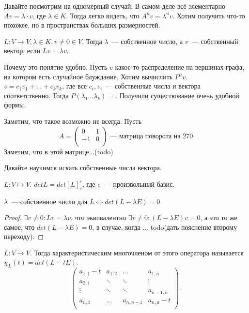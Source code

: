 \begin{motivation}
    Давайте посмотрим на одномерный случай. В самом деле всё элементарно $Av = \lambda\cdot v$, где $\lambda\in K$.
    Тогда легко видеть, что $A^nv = \lambda^n v$. Хотим получить что-то похожее, но в пространствах больших размерностей.
\end{motivation}
\begin{definition}
    $L\colon V\rightarrow V, \lambda\in K, v\not= 0\in V$. Тогда $\lambda$~--- собственное число, а $v$~--- собственный вектор,
    если $Lv = \lambda v$.
\end{definition}
\begin{motivation}
    Почему это понятие удобно. Пусть $v$ какое-то распределение на вершинах графа, на котором есть случайное блуждание.
    Хотим вычислить $P^n v$. $v = c_1v_1 + \dots + c_kv_k$, где все $c_i,v_i$~--- собственные числа и вектора соответственно.
    Тогда $P(\lambda_1\dots \lambda_k) = $.
    Получили существование очень удобной формы.
\end{motivation}
\begin{remark}
    Заметим, что такое возможно не всегда.
    Пусть 
     \[
    A = 
    \begin{pmatrix}
        0& 1\\
        -1&0\\
    \end{pmatrix}
    \text{~--- матрица поворота на 270}\]
    Заметим, что в этой матрице...(todo)
\end{remark}
\begin{motivation}
    Давайте научимся искать собственные числа вектора.
\end{motivation}
\begin{definition}
    $L\colon V\mapsto V$. $det L = det[L]^e_e$, где $e$~--- произвольный базис.
\end{definition}
\begin{statement}
    $\lambda$~--- собственное число для $L \Leftrightarrow det(L - \lambda E) = 0$
\end{statement}
\begin{proof}
    $\exists v\not= 0\colon Lv = \lambda v$, что эквивалентно $\exists v\not=0\colon (L - \lambda E)v = 0$, а это то же
    самое, что $det(L - \lambda E) = 0$, в случае, когда ... todo(дать пояснение второму переходу).
\end{proof}
\begin{definition}
    $L\colon V\rightarrow V$. Тогда характеристическим многочленом от этого оператора 
    называется $\chi_L(t) = det(L - tE)$.
    \[
        \begin{pmatrix}
            a_{1,1}-t&a_{1,2}&\dots&a_{1,n}\\
            a_{2,1} & \ddots & \ddots& \vdots\\
            \vdots & \ddots & \ddots& a_{n-1,n}\\
            a_{n,1} & \dots & a_{n,n-1}& a_{n,n}-t\\
        \end{pmatrix}
    .\] 
\end{definition}
